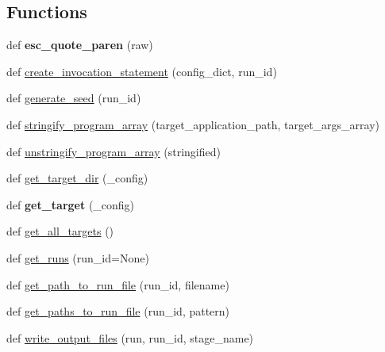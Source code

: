 \subsection*{Functions}
\begin{DoxyCompactItemize}
\item 
\mbox{\label{namespaceharness_1_1state_ade8bc3e331bd8f861a3aa3eedccc5c75}} 
def {\bfseries esc\+\_\+quote\+\_\+paren} (raw)
\item 
def \mbox{\hyperlink{namespaceharness_1_1state_a398bfd8a9197dda72c0e5cbe319c82fc}{create\+\_\+invocation\+\_\+statement}} (config\+\_\+dict, run\+\_\+id)
\item 
def \mbox{\hyperlink{namespaceharness_1_1state_a43f6639ae1d3bfc4444f331960a67855}{generate\+\_\+seed}} (run\+\_\+id)
\item 
def \mbox{\hyperlink{namespaceharness_1_1state_a3cc070e2cac5c2a3d7160e515c8d69d1}{stringify\+\_\+program\+\_\+array}} (target\+\_\+application\+\_\+path, target\+\_\+args\+\_\+array)
\item 
def \mbox{\hyperlink{namespaceharness_1_1state_a1010624bc065ff8834c87b5d32771462}{unstringify\+\_\+program\+\_\+array}} (stringified)
\item 
def \mbox{\hyperlink{namespaceharness_1_1state_ab2c04665bcfefeedd3e1e0ba0b14da1d}{get\+\_\+target\+\_\+dir}} (\+\_\+config)
\item 
\mbox{\label{namespaceharness_1_1state_ae5e907d6f4fa6f51dafdaff73b142cbd}} 
def {\bfseries get\+\_\+target} (\+\_\+config)
\item 
def \mbox{\hyperlink{namespaceharness_1_1state_a9fec55ee8eadd74fdfa6519d5ed012a6}{get\+\_\+all\+\_\+targets}} ()
\item 
def \mbox{\hyperlink{namespaceharness_1_1state_ae3626188f179587a29fe92cc99ad65f6}{get\+\_\+runs}} (run\+\_\+id=None)
\item 
def \mbox{\hyperlink{namespaceharness_1_1state_aafb1c21d483c2c252843d0de81f0f9ba}{get\+\_\+path\+\_\+to\+\_\+run\+\_\+file}} (run\+\_\+id, filename)
\item 
def \mbox{\hyperlink{namespaceharness_1_1state_abb355e4014b234195cc96865107f1931}{get\+\_\+paths\+\_\+to\+\_\+run\+\_\+file}} (run\+\_\+id, pattern)
\item 
def \mbox{\hyperlink{namespaceharness_1_1state_ae75ae7a901905049c347e74b10ecfbc7}{write\+\_\+output\+\_\+files}} (run, run\+\_\+id, stage\+\_\+name)
\item 

\end{DoxyCompactItemize}
